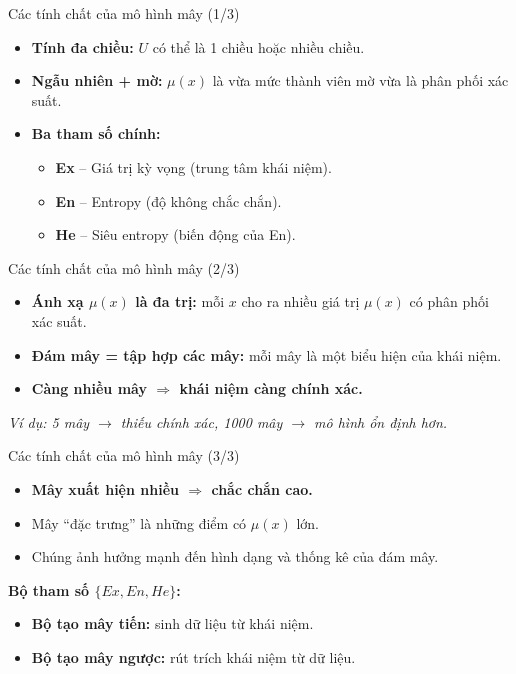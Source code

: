 \documentclass[10pt]{beamer}
\begin{document}
\begin{frame}{Các tính chất của mô hình mây (1/3)}
\begin{itemize}
    \item \textbf{Tính đa chiều:} $U$ có thể là 1 chiều hoặc nhiều chiều.
    \item \textbf{Ngẫu nhiên + mờ:} $\mu(x)$ là vừa mức thành viên mờ vừa là phân phối xác suất.
    \item \textbf{Ba tham số chính:}
    \begin{itemize}
        \item \textbf{Ex} – Giá trị kỳ vọng (trung tâm khái niệm).
        \item \textbf{En} – Entropy (độ không chắc chắn).
        \item \textbf{He} – Siêu entropy (biến động của En).
    \end{itemize}
\end{itemize}
\end{frame}

\begin{frame}{Các tính chất của mô hình mây (2/3)}
\begin{itemize}
    \item \textbf{Ánh xạ $\mu(x)$ là đa trị:} mỗi $x$ cho ra nhiều giá trị $\mu(x)$ có phân phối xác suất.
    \item \textbf{Đám mây = tập hợp các mây:} mỗi mây là một biểu hiện của khái niệm.
    \item \textbf{Càng nhiều mây $\Rightarrow$ khái niệm càng chính xác.}
\end{itemize}

\vspace{0.5em}
\centering
\textit{Ví dụ: 5 mây $\to$ thiếu chính xác, 1000 mây $\to$ mô hình ổn định hơn.}
\end{frame}

\begin{frame}{Các tính chất của mô hình mây (3/3)}
\begin{itemize}
    \item \textbf{Mây xuất hiện nhiều $\Rightarrow$ chắc chắn cao.}
    \item Mây “đặc trưng” là những điểm có $\mu(x)$ lớn.
    \item Chúng ảnh hưởng mạnh đến hình dạng và thống kê của đám mây.
\end{itemize}

\vspace{1em}
\textbf{Bộ tham số $\{Ex, En, He\}$:}
\begin{itemize}
    \item \textbf{Bộ tạo mây tiến:} sinh dữ liệu từ khái niệm.
    \item \textbf{Bộ tạo mây ngược:} rút trích khái niệm từ dữ liệu.
\end{itemize}
\end{frame}
\end{document}
